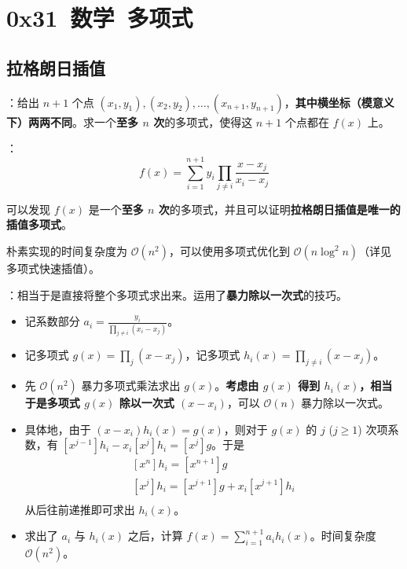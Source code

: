 \section{0x31\ 数学\ 多项式}
\label{sec:0x31}

\subsection{拉格朗日插值}

：给出 $n + 1$ 个点 $(x_1, y_1), (x_2, y_2), \dots, (x_{n + 1}, y_{n + 1})$，\textbf{其中横坐标（模意义下）两两不同}。求一个\textbf{至多 $n$ 次}的多项式，使得这 $n + 1$ 个点都在 $f(x)$ 上。

：
\[
f(x) = \sum\limits_{i = 1}^{n + 1} y_i \prod\limits_{j \neq i} \frac{x - x_j}{x_i - x_j}
\]

可以发现 $f(x)$ 是一个\textbf{至多 $n$ 次}的多项式，并且可以证明\textbf{拉格朗日插值是唯一的插值多项式}。

朴素实现的时间复杂度为 $\mathcal{O}(n^2)$，可以使用多项式优化到 $\mathcal{O}(n \log^2 n)$（详见多项式快速插值）。


：相当于是直接将整个多项式求出来。运用了\textbf{暴力除以一次式}的技巧。

\begin{itemize}
    \item 记系数部分 $a_i = \frac{y_i}{\prod_{j \neq i} (x_i - x_j)}$。
    \item 记多项式 $g(x) = \prod_{j} (x - x_j)$，记多项式 $h_i(x) = \prod_{j \neq i} (x - x_j)$。
    \item 先 $\mathcal{O}(n^2)$ 暴力多项式乘法求出 $g(x)$。\textbf{考虑由 $g(x)$ 得到 $h_i(x)$，相当于是多项式 $g(x)$ 除以一次式 $(x - x_i)$}，可以 $\mathcal{O}(n)$ 暴力除以一次式。
    \item 具体地，由于 $(x - x_i)h_i(x) = g(x)$，则对于 $g(x)$ 的 $j$ ($j \geq 1$) 次项系数，有 $[x^{j - 1}]h_i - x_i[x^j]h_i = [x^j]g$。于是
    \[
    \begin{gathered}
    [x^n]h_i = [x^{n + 1}]g \\
    [x^j]h_i = [x^{j + 1}]g + x_i[x^{j + 1}]h_i \\
    \end{gathered}
    \]
    从后往前递推即可求出 $h_i(x)$。
    \item 求出了 $a_i$ 与 $h_i(x)$ 之后，计算 $f(x) = \sum_{i = 1}^{n + 1}a_ih_i(x)$。时间复杂度 $\mathcal{O}(n^2)$。
\end{itemize}

